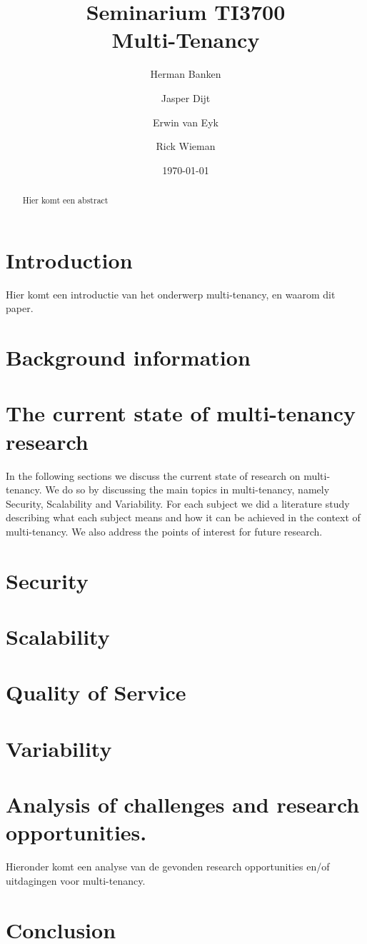 \documentclass{article}
\title{Seminarium TI3700\\ Multi-Tenancy}
\author{Herman Banken\and
    Jasper Dijt\and
    Erwin van Eyk\and
    Rick Wieman}
\date{\today}
\begin{document}
\maketitle
\thispagestyle{empty}

\begin{abstract}
Hier komt een abstract
\end{abstract}


\section{Introduction}
Hier komt een introductie van het onderwerp multi-tenancy, en waarom dit paper.

\section{Background information}


\section{The current state of multi-tenancy research}
In the following sections we discuss the current state of research on multi-tenancy. We do so by discussing the main topics in multi-tenancy, namely Security, Scalability and Variability. For each subject we did a literature study describing what each subject means and how it can be achieved in the context of multi-tenancy. We also address the points of interest for future research.

\section{Security}


\section{Scalability}


\section{Quality of Service}


\section{Variability}


\section{Analysis of challenges and research opportunities.}
Hieronder komt een analyse van de gevonden research opportunities en/of uitdagingen voor multi-tenancy.

\section{Conclusion}



\end{document}

